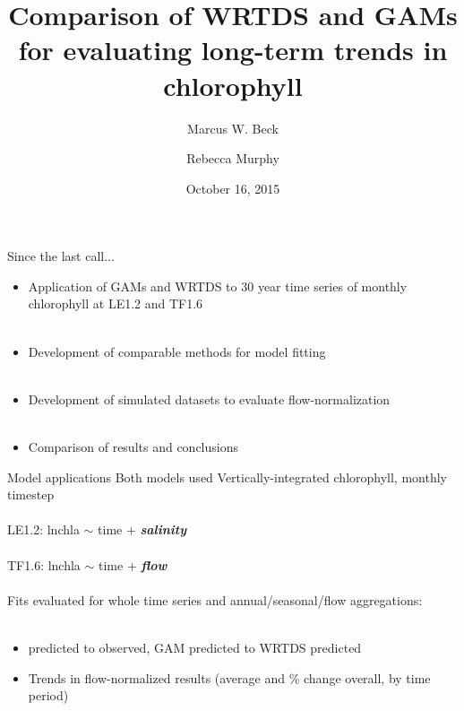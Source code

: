 \documentclass[serif]{beamer}\usepackage[]{graphicx}\usepackage[]{color}
\newcommand{\Bigtxt}[1]{\textbf{\textit{#1}}}
\begin{document}
\title[Comparison of WRTDS and GAMs]{Comparison of WRTDS and GAMs for evaluating long-term trends in chlorophyll}

\author[Beck, Murphy]{Marcus W. Beck \and Rebecca Murphy}

\date{October 16, 2015}


\begin{frame}
\titlepage
\end{frame}

\begin{frame}{Since the last call...}
\begin{itemize}
\item Application of GAMs and WRTDS to 30 year time series of monthly chlorophyll at LE1.2 and TF1.6 \\~\\
\item Development of comparable methods for model fitting \\~\\
\item Development of simulated datasets to evaluate flow-normalization \\~\\
\item Comparison of results and conclusions
\end{itemize}
\end{frame}

\begin{frame}{Model applications}
Both models used Vertically-integrated chlorophyll, monthly timestep \\~\\
LE1.2: lnchla $\sim$ time + \Bigtxt{salinity} \\~\\
TF1.6: lnchla $\sim$ time + \Bigtxt{flow} \\~\\
Fits evaluated for whole time series and annual/seasonal/flow aggregations: \\~\\
\begin{itemize}
\item predicted to observed, GAM predicted to WRTDS predicted
\item Trends in flow-normalized results (average and \% change overall, by time period)
\end{itemize}
\end{frame}
\end{document}
